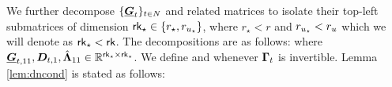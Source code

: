 \smallskip
We further decompose $\{ \underline{\boldsymbol{G}}_{t} \}_{t \in N}$ and related matrices to isolate their top-left submatrices of dimension  $\mathsf{rk}_{\star} \in \{ r_{\star}, r_{u_\star}  \}$, where  $r_{\star}  < r$  and $r_{u_\star} < r_u$ which we will denote as $\mathsf{rk}_{\star} < \mathsf{rk}$.  The decompositions are as follows:
where $\underline{\boldsymbol{G}}_{t,11}, \boldsymbol{D}_{t,1},  \hat{\boldsymbol{\Lambda}}_{11} \in \mathbb{R}^{\mathsf{rk}_{\star} \times \mathsf{rk}_{\star}}$.
We define
and
whenever  $\boldsymbol{\Gamma}_{t}$ is invertible.  Lemma \ref{lem:dncond} is stated as follows:
